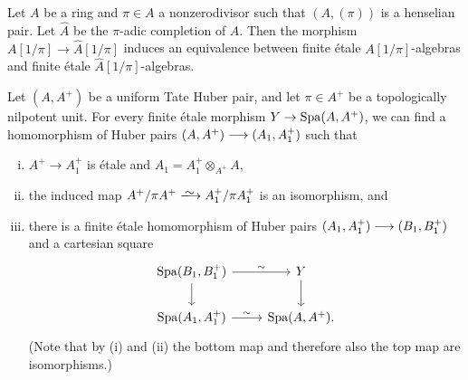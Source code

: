 \begin{lem} \label{Elkik-theorem} 
    Let $A$ be a ring and $\pi\in A$ a nonzerodivisor such that $(A, (\pi))$ is a henselian pair. Let $\widehat{A}$ be the $\pi$-adic completion of $A$. Then the morphism $A[1/\pi]\to \widehat{A}[1/\pi]$ induces an equivalence between finite \'etale $A[1/\pi]$-algebras and finite \'etale $\widehat{A}[1/\pi]$-algebras.
\end{lem}


\begin{cor} \label{finite-etale-Huber-pair}
    Let $(A,A^+)$ be a uniform Tate Huber pair, and let $\pi \in A^+$ be a topologically nilpotent unit.
    For every finite \'etale morphism $Y \to \operatorname{Spa}(A,A^+)$, we can find a homomorphism of Huber pairs
    $(A,A^+) \longrightarrow (A_1,A_1^+)$
    such that 
    \begin{enumerate}[(i)]
    \item 
    $A^+ \to A_1^+$ is \'etale and $A_1 = A_1^+ \otimes_{A^+} A$, 
    \item 
    the induced map $A^+/\pi A^+\isomto A_1^+/\pi A_1^+$ is  an isomorphism, and 
    \item 
    there is a finite \'etale homomorphism of Huber pairs $(A_1,A_1^+) \longrightarrow (B_1,B_1^+)$ and a cartesian square
    \[ 
    \begin{tikzcd}
        \Spa(B_1,B_1^+) \ar[d] \ar[r,"\sim"] & Y \ar[d] \\
        \Spa(A_1,A_1^+) \ar[r,"\sim"] & \Spa(A,A^+) . 
    \end{tikzcd}
    \]
    (Note that by (i) and (ii) the bottom map and therefore also the top map are isomorphisms.)
    \end{enumerate}
\end{cor}


